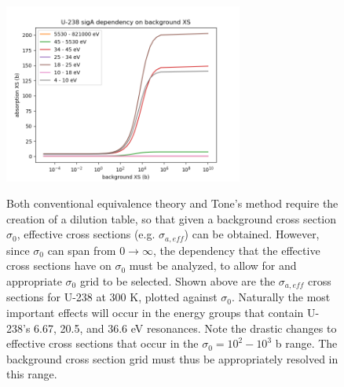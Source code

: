 \documentclass[10pt]{article}
\begin{document}
  \begin{figure}[H]
    \begin{center}
    \includegraphics[width=0.7\textwidth]{U238_sigA_dependency_on_background}\\
      \caption{Both conventional equivalence theory and Tone's method require the creation of a dilution table, so that given a background cross section $\sigma_0$, effective cross sections (e.g. $\sigma_{a,eff}$) can be obtained. However, since $\sigma_0$ can span from $0\rightarrow\infty$, the dependency that the effective cross sections have on $\sigma_0$ must be analyzed, to allow for and appropriate $\sigma_0$ grid to be selected. Shown above are the $\sigma_{a,eff}$ cross sections for U-238 at 300 K, plotted against $\sigma_0$. Naturally the most important effects will occur in the energy groups that contain U-238's 6.67, 20.5, and 36.6 eV resonances. Note the drastic changes to effective cross sections that occur in the $\sigma_0=10^2-10^3$ b range. The background cross section grid must thus be appropriately resolved in this range. }
      \label{fig:dependencyOnBackground}
    \end{center}
  \end{figure}
\end{document}
